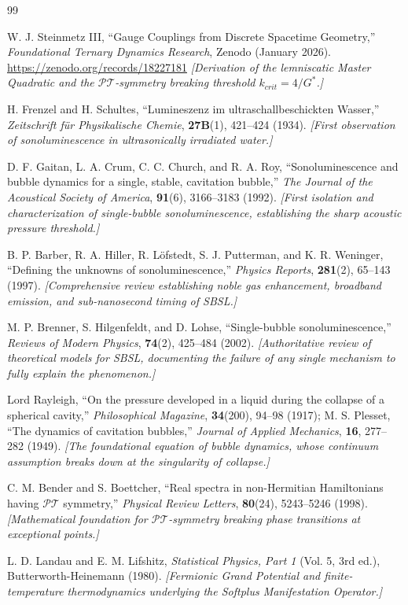 \documentclass[11pt, letterpaper]{article}
\newcommand{\G}{G^*}
\newcommand{\PT}{\mathcal{PT}}
\theoremstyle{definition}
\theoremstyle{remark}
\begin{document}
\begin{thebibliography}{99}

W. J. Steinmetz III,
``Gauge Couplings from Discrete Spacetime Geometry,''
\textit{Foundational Ternary Dynamics Research}, Zenodo (January 2026).
\url{https://zenodo.org/records/18227181}
\newblock \textit{[Derivation of the lemniscatic Master Quadratic and the $\PT$-symmetry breaking threshold $k_{crit} = 4/\G$.]}

H. Frenzel and H. Schultes,
``Lumineszenz im ultraschallbeschickten Wasser,''
\textit{Zeitschrift f\"ur Physikalische Chemie}, \textbf{27B}(1), 421--424 (1934).
\newblock \textit{[First observation of sonoluminescence in ultrasonically irradiated water.]}

D. F. Gaitan, L. A. Crum, C. C. Church, and R. A. Roy,
``Sonoluminescence and bubble dynamics for a single, stable, cavitation bubble,''
\textit{The Journal of the Acoustical Society of America}, \textbf{91}(6), 3166--3183 (1992).
\newblock \textit{[First isolation and characterization of single-bubble sonoluminescence, establishing the sharp acoustic pressure threshold.]}

B. P. Barber, R. A. Hiller, R. L\"ofstedt, S. J. Putterman, and K. R. Weninger,
``Defining the unknowns of sonoluminescence,''
\textit{Physics Reports}, \textbf{281}(2), 65--143 (1997).
\newblock \textit{[Comprehensive review establishing noble gas enhancement, broadband emission, and sub-nanosecond timing of SBSL.]}

M. P. Brenner, S. Hilgenfeldt, and D. Lohse,
``Single-bubble sonoluminescence,''
\textit{Reviews of Modern Physics}, \textbf{74}(2), 425--484 (2002).
\newblock \textit{[Authoritative review of theoretical models for SBSL, documenting the failure of any single mechanism to fully explain the phenomenon.]}

Lord Rayleigh,
``On the pressure developed in a liquid during the collapse of a spherical cavity,''
\textit{Philosophical Magazine}, \textbf{34}(200), 94--98 (1917);
M. S. Plesset,
``The dynamics of cavitation bubbles,''
\textit{Journal of Applied Mechanics}, \textbf{16}, 277--282 (1949).
\newblock \textit{[The foundational equation of bubble dynamics, whose continuum assumption breaks down at the singularity of collapse.]}

C. M. Bender and S. Boettcher,
``Real spectra in non-Hermitian Hamiltonians having $\mathcal{PT}$ symmetry,''
\textit{Physical Review Letters}, \textbf{80}(24), 5243--5246 (1998).
\newblock \textit{[Mathematical foundation for $\PT$-symmetry breaking phase transitions at exceptional points.]}

L. D. Landau and E. M. Lifshitz,
\textit{Statistical Physics, Part 1} (Vol. 5, 3rd ed.), Butterworth-Heinemann (1980).
\newblock \textit{[Fermionic Grand Potential and finite-temperature thermodynamics underlying the Softplus Manifestation Operator.]}

\end{thebibliography}
\end{document}
